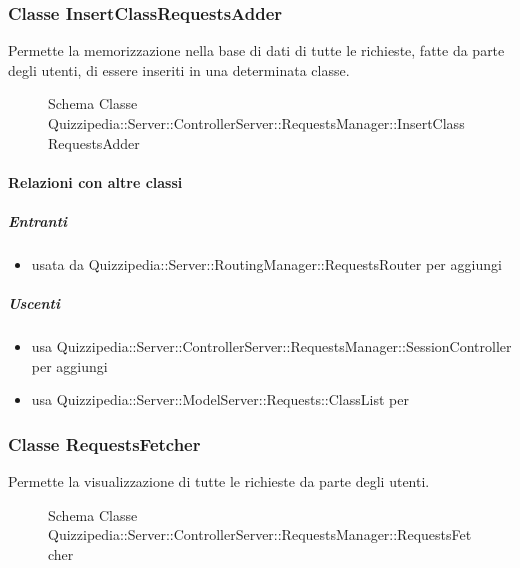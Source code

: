\subsubsection{Classe InsertClassRequestsAdder}
Permette la memorizzazione nella base di dati di tutte le richieste, fatte da parte degli utenti, di essere inseriti in una determinata classe.
\begin{figure}[H]
\centering
\noindent{}
\caption[Schema Classe InsertClassRequestsAdder]{Schema Classe Quizzipedia::Server::ControllerServer::RequestsManager::InsertClassRequestsAdder}
\end{figure}
\paragraph{Relazioni con altre classi}
\subparagraph{Entranti}
\begin{itemize}
\item usata da Quizzipedia::Server::RoutingManager::RequestsRouter per aggiungi
\end{itemize}
\subparagraph{Uscenti}
\begin{itemize}
\item usa Quizzipedia::Server::ControllerServer::RequestsManager::SessionController per aggiungi
\item usa Quizzipedia::Server::ModelServer::Requests::ClassList per 
\end{itemize}
\subsubsection{Classe RequestsFetcher}
Permette la visualizzazione di tutte le richieste da parte degli utenti.
\begin{figure}[H]
\centering
\noindent{}
\caption[Schema Classe RequestsFetcher]{Schema Classe Quizzipedia::Server::ControllerServer::RequestsManager::RequestsFetcher}
\end{figure}
